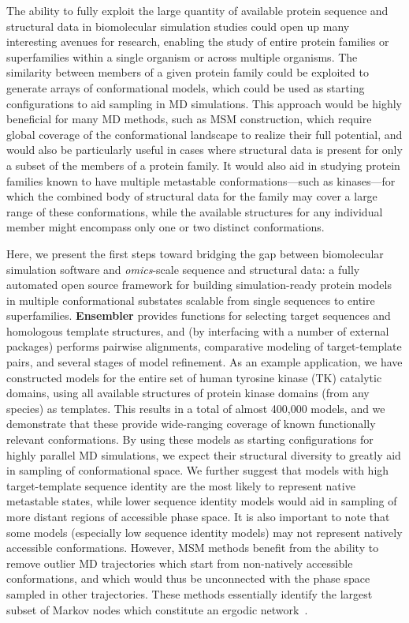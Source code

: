\documentclass[aps,prl,preprint,nofootinbib,superscriptaddress,linenumbers]{revtex4-1}
\begin{document}
The ability to fully exploit the large quantity of available protein sequence and structural data in biomolecular simulation studies could open up many interesting avenues for research, enabling the study of entire protein families or superfamilies within a single organism or across multiple organisms.
The similarity between members of a given protein family could be exploited to generate arrays of conformational models, which could be used as starting configurations to aid sampling in MD simulations.
This approach would be highly beneficial for many MD methods, such as MSM construction, which require global coverage of the conformational landscape to realize their full potential, and would also be particularly useful in cases where structural data is present for only a subset of the members of a protein family.
It would also aid in studying protein families known to have multiple metastable conformations---such as kinases---for which the combined body of structural data for the family may cover a large range of these conformations, while the available structures for any individual member might encompass only one or two distinct conformations.

Here, we present the first steps toward bridging the gap between biomolecular simulation software and \emph{omics}-scale sequence and structural data: a fully automated open source framework for building simulation-ready protein models in multiple conformational substates scalable from single sequences to entire superfamilies.
{\bf Ensembler} provides functions for selecting target sequences and homologous template structures, and (by interfacing with a number of external packages) performs pairwise alignments, comparative modeling of target-template pairs, and several stages of model refinement.
As an example application, we have constructed models for the entire set of human tyrosine kinase (TK) catalytic domains, using all available structures of protein kinase domains (from any species) as templates.
This results in a total of almost 400,000 models, and we demonstrate that these provide wide-ranging coverage of known functionally relevant conformations.
By using these models as starting configurations for highly parallel MD simulations, we expect their structural diversity to greatly aid in sampling of conformational space.
We further suggest that models with high target-template sequence identity are the most likely to represent native metastable states, while lower sequence identity models would aid in sampling of more distant regions of accessible phase space.
It is also important to note that some models (especially low sequence identity models) may not represent natively accessible conformations.
However, MSM methods benefit from the ability to remove outlier MD trajectories which start from non-natively accessible conformations, and which would thus be unconnected with the phase space sampled in other trajectories.
These methods essentially identify the largest subset of Markov nodes which constitute an ergodic network~\cite{msmbuilder,caflisch:jpcb:2011:msm-subgraph}.
\end{document}
